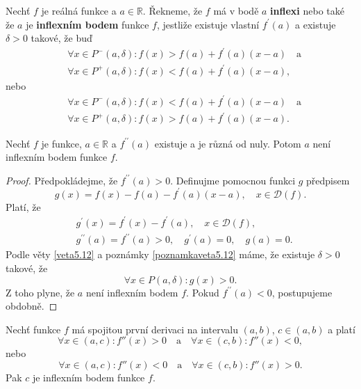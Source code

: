 \begin{definice}
Nechť $f$ je reálná funkce a $a \in \mathbb R $. Řekneme, že
$f$ má v bodě $a$ \textbf{inflexi} nebo také že $a$ je
\textbf{inflexním bodem} funkce $f$, jestliže existuje vlastní
$f^\prime(a)$ a existuje $\delta > 0$ takové, že buď
\begin{align*}
	&\forall x \in P^-(a,\delta):f(x)>f(a)+f^\prime(a)(x-a) \quad \textrm{a}\\
	&\forall x \in P^+(a,\delta):f(x)<f(a)+f^\prime(a)(x-a),
\end{align*}
nebo
\begin{align*}
	&\forall x \in P^-(a,\delta):f(x)<f(a)+f^\prime(a)(x-a) \quad \textrm{a}\\
	&\forall x \in P^+(a,\delta):f(x)>f(a)+f^\prime(a)(x-a).
\end{align*}
\end{definice}

\begin{veta} \label{veta5.17}
Nechť $f$ je funkce, $a\in \mathbb R $ a $f^{\prime\prime}(a)$ existuje
a je různá od nuly. Potom $a$ není inflexním bodem funkce $f$.
\end{veta}

\begin{proof}
	Předpokládejme, že $f^{\prime\prime}(a)>0$. Definujme pomocnou funkci $g$ předpisem
	$$g(x) = f(x)-f(a)-f^\prime(a)(x-a), \quad x \in \mathcal D(f).$$
	Platí, že
	\begin{align*}
	&g^\prime(x) = f^\prime(x)-f^\prime(a), \quad x \in \mathcal D(f),\\
	&g^{\prime\prime}(a) = f^{\prime\prime}(a)>0, \quad g^\prime(a) = 0,\quad g(a)=0.
	\end{align*}
	Podle věty \ref{veta5.12} a poznámky \ref{poznamkaveta5.12} máme, že existuje $\delta > 0$ takové, že
	$$
	    \forall x \in P(a,\delta): g(x) > 0.
	$$
	Z toho plyne, že $a$ není inflexním bodem $f$. Pokud $f^{\prime\prime}(a) < 0$, postupujeme obdobně.
\end{proof}

\begin{veta} \label{veta5.18}
Nechť funkce $f$ má spojitou první derivaci na intervalu $(a,b)$, $c \in (a,b)$ a platí
\[
\forall x \in (a,c): f''(x) > 0 \quad \text{a} \quad \forall x \in (c,b): f''(x) < 0,
\]
nebo
\[
\forall x \in (a,c): f''(x) < 0 \quad \text{a} \quad \forall x \in (c,b): f''(x) > 0.
\]
Pak $c$ je inflexním bodem funkce $f$.
\end{veta}

